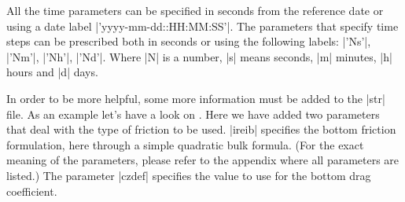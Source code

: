 All the time parameters can be specified in seconds from the reference
date or using a date label |'yyyy-mm-dd::HH:MM:SS'|. The parameters that specify
time steps can be prescribed both in seconds or using the following labels: 
|'Ns'|, |'Nm'|, |'Nh'|, |'Nd'|. 
Where |N| is a number, |s| means seconds, |m| minutes, |h| hours and |d| days.

In order to be more helpful, some more information must be added to the
|str| file. As an example let's have a look on . Here
we have added two parameters that deal with the type of friction
to be used. |ireib| specifies the bottom friction formulation, here
through a simple quadratic bulk formula. (For the exact meaning of the
parameters, please refer to the appendix where all parameters
are listed.) The parameter |czdef| specifies the value to use for the
bottom drag coefficient.


